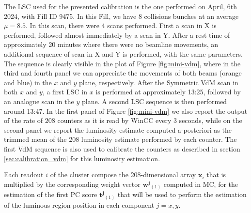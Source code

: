 The LSC used for the presented calibration is the one performed on April, 6th 2024, with Fill ID 9475. In this Fill, we have 8 collisions bunches at an average $\mu=8.5$. In this scan, there were 4 scans performed. First a scan in X is performed, followed almost immediately by a scan in Y. After a rest time of approximately 20 minutes where there were no beamline movements, an additional sequence of scan in X and Y is performed, with the same parameters. The sequence is clearly visible in the plot of Figure \ref{fig:mini-vdm}, where in the third and fourth panel we can appreciate the movements of both beams (orange and blue) in the $x$ and $y$ plane, respectively. After the Symmetric VdM scan in both $x$ and $y$, a first LSC in $x$ is performed at approximately 13:25, followed by an analogue scan in the $y$ plane. A second LSC sequence is then performed around 13:47. In the first panel of Figure \ref{fig:mini-vdm} we also report the output of the rate of 208 counters as it is read by WinCC every 3 seconds, while on the second panel we report the luminosity estimate computed a-posteriori as the trimmed mean of the 208 luminosity estimate performed by each counter. The first VdM sequence is also used to calibrate the counters as described in section \ref{sec:calibration_vdm} for this luminosity estimation. 

Each readout $i$ of the cluster compose the 208-dimensional array $\mathbf{x}_i$ that is multiplied by the corresponding weight vector $\mathbf{w^j}_{(1)}$ computed in MC, for the estimation of the first PC score $\mathbf{t^j}_{(1)}$ that will be used to perform the estimation of the luminous region position in each component $j=x,y$. 

